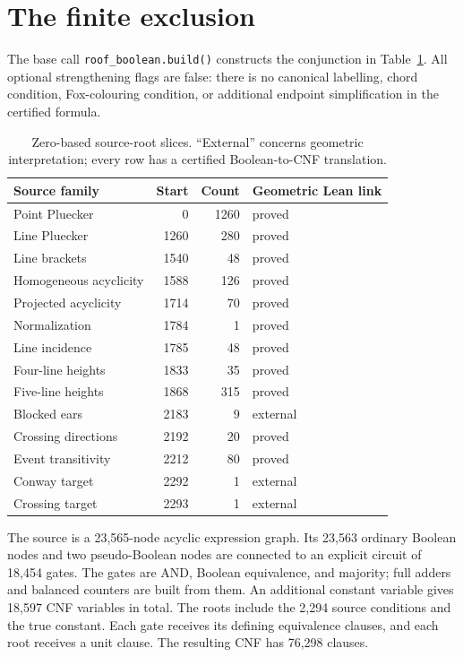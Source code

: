 \documentclass[11pt]{article}
\newcommand{\code}[1]{\nolinkurl{#1}}
\begin{document}
\section{The finite exclusion}\label{sec:formal}
The base call \code{roof_boolean.build()} constructs the conjunction
in Table~\ref{tab:roots}. All optional strengthening flags are false:
there is no canonical labelling, chord condition, Fox-colouring condition,
or additional endpoint simplification in the certified formula.

\begin{table}[ht]
\centering\small
\begin{tabular}{lrrl}
\toprule
Source family & Start & Count & Geometric Lean link\\
\midrule
Point Pluecker &0&1260&proved\\
Line Pluecker &1260&280&proved\\
Line brackets &1540&48&proved\\
Homogeneous acyclicity &1588&126&proved\\
Projected acyclicity &1714&70&proved\\
Normalization &1784&1&proved\\
Line incidence &1785&48&proved\\
Four-line heights &1833&35&proved\\
Five-line heights &1868&315&proved\\
Blocked ears &2183&9&external\\
Crossing directions &2192&20&proved\\
Event transitivity &2212&80&proved\\
Conway target &2292&1&external\\
Crossing target &2293&1&external\\
\bottomrule
\end{tabular}
\caption{Zero-based source-root slices. ``External'' concerns geometric
interpretation; every row has a certified Boolean-to-CNF translation.}
\label{tab:roots}
\end{table}

The source is a 23,565-node acyclic expression graph. Its 23,563 ordinary
Boolean nodes and two pseudo-Boolean nodes are connected to an explicit
circuit of 18,454 gates. The gates are AND, Boolean equivalence, and
majority; full adders and balanced counters are built from them.
An additional constant variable gives 18,597 CNF variables in total.
The roots include the 2,294 source conditions and the true constant.
Each gate receives its defining equivalence clauses, and each root
receives a unit clause. The resulting CNF has 76,298 clauses.
\end{document}
